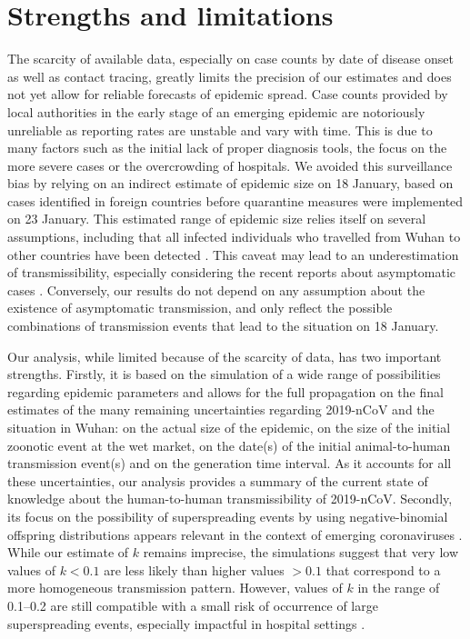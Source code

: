 \documentclass{article}
\begin{document}
\section*{Strengths and limitations}

The scarcity of available data, especially on case counts by date of disease onset as well as contact tracing, greatly limits the precision of our estimates and does not yet allow for reliable forecasts of epidemic spread. Case counts provided by local authorities in the early stage of an emerging epidemic are notoriously unreliable as reporting rates are unstable and vary with time. This is due to many factors such as the initial lack of proper diagnosis tools, the focus on the more severe cases or the overcrowding of hospitals. We avoided this surveillance bias by relying on an indirect estimate of epidemic size on 18 January, based on cases identified in foreign countries before quarantine measures were implemented on 23 January. This estimated range of epidemic size relies itself on several assumptions, including that all infected individuals who travelled from Wuhan to other countries have been detected \cite{Imai:2020}. This caveat may lead to an underestimation of transmissibility, especially considering the recent reports about asymptomatic cases \cite{chan2020familial}. Conversely, our results do not depend on any assumption about the existence of asymptomatic transmission, and only reflect the possible combinations of transmission events that lead to the situation on 18 January. 

Our analysis, while limited because of the scarcity of data, has two important strengths. Firstly, it is based on the simulation of a wide range of possibilities regarding epidemic parameters and allows for the full propagation on the final estimates of the many remaining uncertainties regarding 2019-nCoV and the situation in Wuhan: on the actual size of the epidemic, on the size of the initial zoonotic event at the wet market, on the date(s) of the initial animal-to-human transmission event(s) and on the generation time interval. As it accounts for all these uncertainties, our analysis provides a summary of the current state of knowledge about the human-to-human transmissibility of 2019-nCoV. Secondly, its focus on the possibility of superspreading events by using negative-binomial offspring distributions appears relevant in the context of emerging coronaviruses \cite{Lloyd-Smith:2005,Althaus:2015b}. While our estimate of $k$ remains imprecise, the simulations suggest that very low values of $k<0.1$ are less likely than higher values $>0.1$ that correspond to a more homogeneous transmission pattern. However, values of $k$ in the range of 0.1–0.2 are still compatible with a small risk of occurrence of large superspreading events, especially impactful in hospital settings \cite{oh2015middle,assiri2013hospital}.
\end{document}
